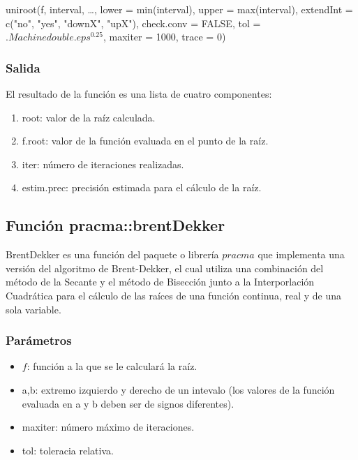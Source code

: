 \documentclass[a4paper,12pt]{article}
\begin{document}
 uniroot(f, interval, …,
        lower = min(interval), upper = max(interval),
        extendInt = c("no", "yes", "downX", "upX"), check.conv = FALSE,
        tol = $.Machinedouble.eps^0.25$, maxiter = 1000, trace = 0)

\subsubsection{Salida}
El resultado de la función es una lista de cuatro componentes:
\begin{enumerate}
    \item root: valor de la raíz calculada.
    \item f.root: valor de la función evaluada en el punto de la raíz.
    \item iter: número de iteraciones realizadas.
    \item estim.prec: precisión estimada para el cálculo de la raíz.
\end{enumerate}

\subsection{Función pracma::brentDekker}

BrentDekker es una función del paquete o librería $pracma$ que implementa una versión del algoritmo de Brent-Dekker, el cual utiliza una combinación del método de la Secante y el método de Bisección junto a la Interporlación Cuadrática para el cálculo de las raíces de una función continua, real y de una sola variable.


\subsubsection{Parámetros}

\begin{itemize}
    \item $f$: función a la que se le calculará la raíz.
    \item a,b: extremo izquierdo y derecho de un intevalo (los valores de la función evaluada en a y b deben ser de signos diferentes).
    \item maxiter: número máximo de iteraciones.
    \item tol: toleracia relativa.
\end{itemize}
\end{document}
